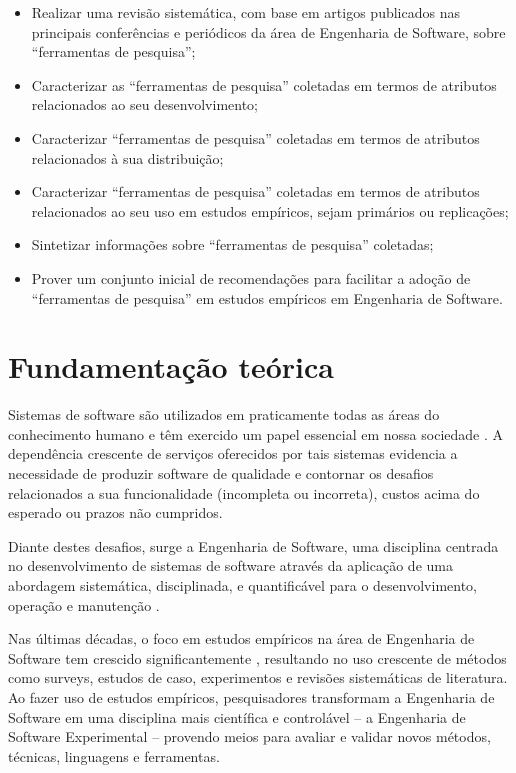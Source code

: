 \documentclass[12pt]{article}
\begin{document}
\begin{itemize}
  \item Realizar uma revisão sistemática, com base em artigos publicados nas
    principais conferências e periódicos da área de Engenharia de Software,
    sobre “ferramentas de pesquisa”;
  \item Caracterizar as “ferramentas de pesquisa” coletadas em termos de
    atributos relacionados ao seu desenvolvimento;
  \item Caracterizar  “ferramentas de pesquisa” coletadas em termos de
    atributos relacionados à sua distribuição;
  \item Caracterizar “ferramentas de pesquisa” coletadas  em termos de
    atributos relacionados ao seu uso em estudos empíricos, sejam primários ou
    replicações;
  \item Sintetizar informações sobre “ferramentas de pesquisa” coletadas;
  \item Prover um conjunto inicial de recomendações para facilitar a adoção de
    “ferramentas de pesquisa”  em estudos empíricos em Engenharia de Software. 
\end{itemize}

\section{Fundamentação teórica}

Sistemas de software são utilizados em praticamente todas as áreas do
conhecimento humano e têm exercido um papel essencial em nossa sociedade
\cite{Mafra2006}. A dependência crescente de serviços oferecidos por tais
sistemas evidencia a necessidade de produzir software de qualidade e contornar
os  desafios relacionados a sua funcionalidade (incompleta ou incorreta),
custos acima do esperado ou prazos não cumpridos.

Diante destes desafios, surge a Engenharia de Software, uma disciplina
centrada no desenvolvimento de sistemas de software \cite{Wohlin2012} através
da aplicação de uma abordagem sistemática, disciplinada, e quantificável para
o desenvolvimento, operação e manutenção \cite{SWEBOK2014}.

Nas últimas décadas, o foco em estudos empíricos na área de Engenharia de
Software tem crescido significantemente \cite{Stol2015}, resultando no uso
crescente de métodos como surveys, estudos de caso, experimentos e revisões
sistemáticas de literatura. Ao fazer uso de estudos empíricos, pesquisadores
transformam a Engenharia de Software em uma disciplina mais científica e
controlável -- a  Engenharia de Software Experimental -- provendo meios para
avaliar e validar novos métodos, técnicas, linguagens e ferramentas.
\end{document}
